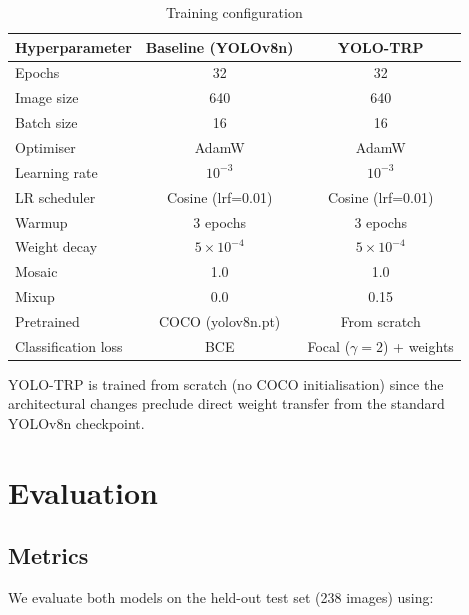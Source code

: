 \documentclass[12pt, a4paper]{article}
\begin{document}
\begin{table}[H]
\centering
\caption{Training configuration}
\label{tab:training}
\begin{tabular}{lcc}
\toprule
\textbf{Hyperparameter} & \textbf{Baseline (YOLOv8n)} & \textbf{YOLO-TRP} \\
\midrule
Epochs           & 32              & 32               \\
Image size       & 640             & 640              \\
Batch size       & 16              & 16               \\
Optimiser        & AdamW           & AdamW            \\
Learning rate    & $10^{-3}$       & $10^{-3}$        \\
LR scheduler     & Cosine (lrf=0.01) & Cosine (lrf=0.01) \\
Warmup           & 3 epochs        & 3 epochs         \\
Weight decay     & $5 \times 10^{-4}$ & $5 \times 10^{-4}$ \\
Mosaic           & 1.0             & 1.0              \\
Mixup            & 0.0             & 0.15             \\
Pretrained       & COCO (yolov8n.pt) & From scratch    \\
Classification loss & BCE         & Focal ($\gamma=2$) + weights \\
\bottomrule
\end{tabular}
\end{table}

\noindent YOLO-TRP is trained from scratch (no COCO initialisation) since the architectural changes preclude direct weight transfer from the standard YOLOv8n checkpoint.

\section{Evaluation}

\subsection{Metrics}

We evaluate both models on the held-out test set (238 images) using:
\end{document}
